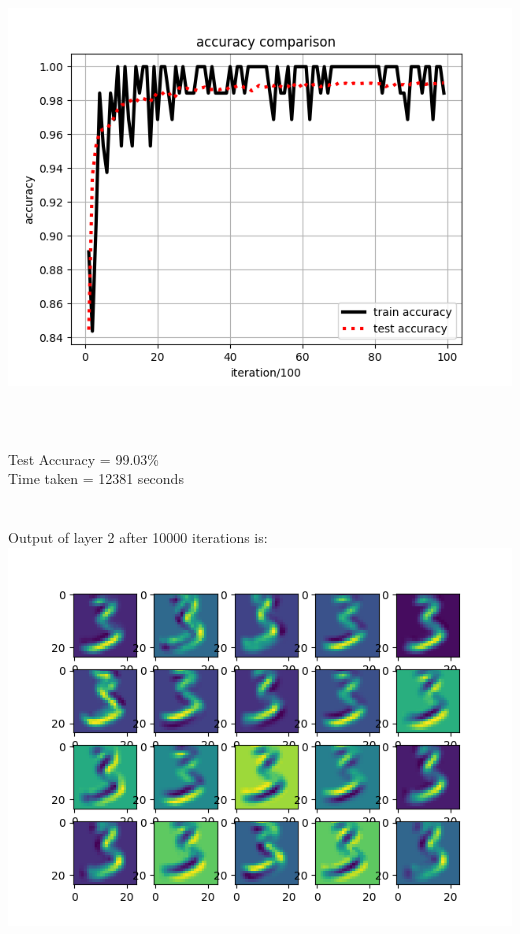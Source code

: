 \documentclass[fleqn]{article}
\begin{document}
\section{}
\begin{adjustwidth}{4em}{0pt}
	\includegraphics[scale = 1]{accuracy_comparison.png}\\ \\	
\end{adjustwidth}

\section{}
\begin{adjustwidth}{4em}{0pt}
	Test Accuracy = 99.03\%\\ 
	Time taken = 12381 seconds\\	
\end{adjustwidth}

\section{}
\begin{adjustwidth}{4em}{0pt}
	Output of layer 2 after 10000 iterations is: \\
	\includegraphics[scale = 1]{output2_10000_iterations.png}\\ \\	
\end{adjustwidth}
\end{document}
